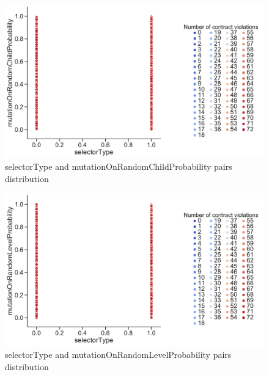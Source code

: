 \begin{figure}
	\centering
	\includegraphics[width=\textwidth]{images/PairsDistr/selectorType_mutationOnRandomChildProbability.pdf}
	\caption[selectorType and mutationOnRandomChildProbability pairs distribution]{selectorType and mutationOnRandomChildProbability pairs distribution}
	\label{fig:selectorType_mutationOnRandomChildProbability_pair}
\end{figure}
\begin{figure}
	\centering
	\includegraphics[width=\textwidth]{images/PairsDistr/selectorType_mutationOnRandomLevelProbability.pdf}
	\caption[selectorType and mutationOnRandomLevelProbability pairs distribution]{selectorType and mutationOnRandomLevelProbability pairs distribution}
	\label{fig:selectorType_mutationOnRandomLevelProbability_pair}
\end{figure}
